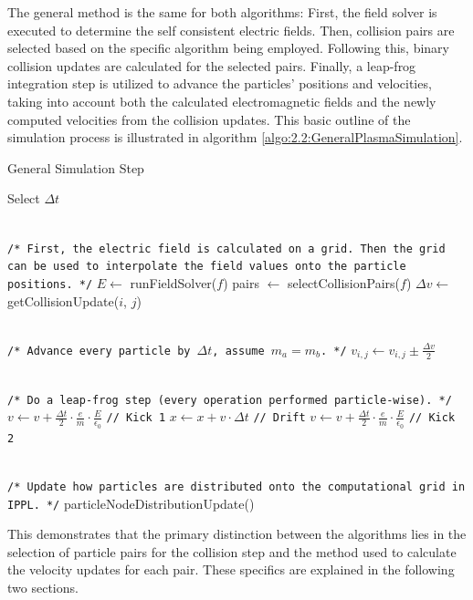 The general method is the same for both algorithms: First, the field solver is executed to determine the self consistent electric fields. Then, collision pairs are selected based on the specific algorithm being employed. Following this, binary collision updates are calculated for the selected pairs. Finally, a leap-frog integration step is utilized to advance the particles' positions and velocities, taking into account both the calculated electromagnetic fields and the newly computed velocities from the collision updates. This basic outline of the simulation process is illustrated in algorithm \ref{algo:2.2:GeneralPlasmaSimulation}. \\
\begin{algorithm}[H]
\caption{General Simulation Step}\label{algo:2.2:GeneralPlasmaSimulation}
\begin{algorithmic}[1]
    \STATE Select $\Delta t$
    
    \texttt{\\/* First, the electric field is calculated on a grid. Then the grid can be used to interpolate the field values onto the particle positions. */}
    \STATE $E \leftarrow$ runFieldSolver($f$)
    \STATE pairs $\leftarrow$ selectCollisionPairs($f$)
        \STATE $\Delta v \leftarrow$ getCollisionUpdate($i$, $j$) 
        
        \texttt{\\/* Advance every particle by $\Delta t$, assume $m_a=m_b$. */}
        \STATE $v_{i, j} \leftarrow v_{i, j} \pm \frac{\Delta v}{2}$ 
    \ENDFOR

    \texttt{\\/* Do a leap-frog step (every operation performed particle-wise). */}
    \STATE $v \leftarrow v + \frac{\Delta t}{2} \cdot \frac{e}{m} \cdot \frac{E}{\epsilon_0}$ \texttt{// Kick 1}
    \STATE $x \leftarrow x + v \cdot \Delta t$ \texttt{// Drift}
    \STATE $v \leftarrow v + \frac{\Delta t}{2} \cdot \frac{e}{m} \cdot \frac{E}{\epsilon_0}$ \texttt{// Kick 2}

    \texttt{\\/* Update how particles are distributed onto the computational grid in IPPL. */}
    \STATE particleNodeDistributionUpdate()
\end{algorithmic}
\end{algorithm}
This demonstrates that the primary distinction between the algorithms lies in the selection of particle pairs for the collision step and the method used to calculate the velocity updates for each pair. These specifics are explained in the following two sections.



